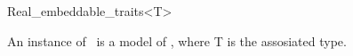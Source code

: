 \begin{ccRefClass}{Real_embeddable_traits<T>}

\ccDefinition

An instance of \ccClassTemplateName\ is a model of , where {\sc T} is the assosiated type. 


\ccSeeAlso
{}\\

\end{ccRefClass} 
